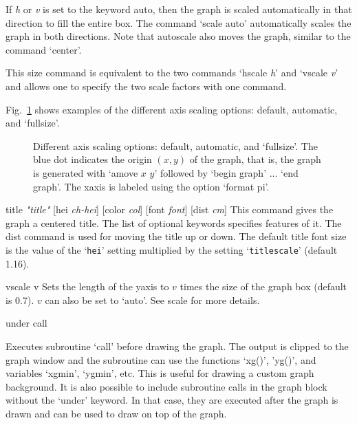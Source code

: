 \begin{commanddescription}
If {\it h} or {\it v} is set to the keyword {\sf auto}, then the graph is scaled automatically in that direction to fill the entire box. The command `{\sf scale auto}' automatically scales the graph in both directions. Note that autoscale also moves the graph, similar to the command `{\sf center}'.

This {\sf size} command is equivalent to the two commands `{\sf hscale {\it h}}' and `{\sf vscale {\it v}}' and allows one to specify the two scale factors with one command.

Fig.~\ref{grscale:fig} shows examples of the different axis scaling options: default, automatic, and `{\sf fullsize}'.

\begin{figure}[tb]
\centering
\mbox{}
\caption{\label{grscale:fig}Different axis scaling options: default, automatic, and `{\sf fullsize}'. The blue dot indicates the origin $(x,y)$ of the graph, that is, the graph is generated with `{\sf amove $x$ $y$}' followed by `{\sf begin graph}' ... `{\sf end graph}'. The xaxis is labeled using the option `{\sf format pi}'.}
\end{figure}

\item[{\sf title {\it "title"}  [hei {\it ch-hei}] [color {\it col}] [font {\it font}] [dist {\it cm}]  }   ]
This command gives the graph a centered title.  The list of optional keywords specifies features of it.  The {\sf dist} command is used for moving the title up or down. The default title font size is the value of the `\texttt{hei}' setting multiplied by the setting `\texttt{titlescale}' (default 1.16).

\item[{\sf vscale v}]
Sets the length of the yaxis to $v$ times the size of the graph box (default is 0.7). $v$ can also be set to `{\sf auto}'. See {\sf scale} for more details.

\item[{\sf under call}]

Executes subroutine `call' before drawing the graph. The output is clipped to the graph window and the subroutine can use the functions `xg()', 'yg()', and variables `xgmin', `ygmin', etc. This is useful for drawing a custom graph background. It is also possible to include subroutine calls in the graph block without the `under' keyword. In that case, they are executed after the graph is drawn and can be used to draw on top of the graph.


\end{commanddescription}
